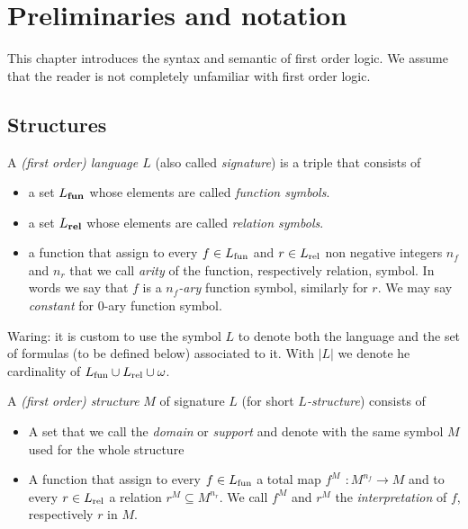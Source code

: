 \chapter{Preliminaries and notation}\label{termini}
This chapter introduces the syntax and semantic of first order logic. We assume that the reader is not completely unfamiliar with first order logic. 


\section{Structures}

A \emph{(first order) language $L$\/}  (also called \emph{signature\/}) is a triple that consists of

\begin{itemize}
\item a set \emph{$L_{\rm\bf fun}$} whose elements are called \emph{function symbols}.
\item a set \emph{$L_{\rm\bf rel}$\/} whose elements are called \emph{relation symbols}.
\item a function that assign to every $f\in L_{\rm fun}$ and $r\in L_{\rm rel}$ non negative integers $n_f$ and $n_r$ that we call \emph{arity\/} of the function, respectively relation, symbol. In words we say that $f$ is a \emph{$n_f$-ary} function symbol, similarly for $r$. We may say \emph{constant\/} for $0$-ary function symbol.
\end{itemize}

Waring: it is custom to use the symbol \emph{$L$} to denote both the language and the set of formulas (to be defined below) associated to it. With \emph{$|L|$} we denote he cardinality of $L_{\rm fun}\cup L_{\rm rel}\cup\omega$.


A \emph{(first order) structure\/} $M$ of signature $L$ (for short \emph{$L$-structure}) consists of

\begin{itemize}
\item A set that we call the \emph{domain\/} or \emph{support} and denote with the same symbol $M$ used for the whole structure
\item A function that assign to every $f\in L_{\rm fun}$ a total map \emph{$f^M$ $: M^{n_f}\to M$} and to every  $r\in L_{\rm rel}$ a relation \emph{$r^M\subseteq M^{n_r}$}. We call $f^M$ and $r^M$ the \emph{interpretation\/} of $f$, respectively $r$ in $M$.
\end{itemize}

